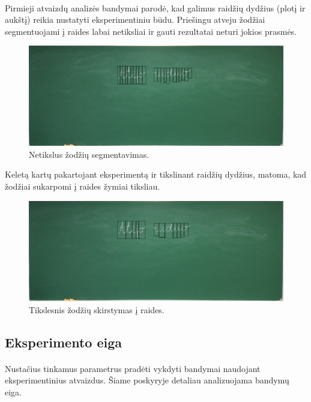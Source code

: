 \documentclass[a4paper,12pt]{article}
\begin{document}
\paragraph{} Pirmieji atvaizdų analizės bandymai parodė, kad galimus raidžių dydžius (plotį ir aukštį) reikia nustatyti eksperimentiniu būdu. Priešingu atveju žodžiai segmentuojami į raides labai netiksliai ir gauti rezultatai neturi jokios prasmės.
		\begin{figure}[H]
			\centering
			\includegraphics[scale=0.2]{images/wrongsegmentation}
			\caption{Netikslus žodžių segmentavimas.}   %
			\label{img:wrongsegmentation}
		\end{figure}

Keletą kartų pakartojant eksperimentą ir tikslinant raidžių dydžius, matoma, kad žodžiai sukarpomi į raides žymiai tiksliau.
	\begin{figure}[H]
		\centering
		\includegraphics[scale=0.2]{images/rightsegmentation}
		\caption{Tikslesnis žodžių skirstymas į raides.}   %
		\label{img:rightsegmentation}
	\end{figure}
	
\subsection{Eksperimento eiga}
\paragraph{} Nustačius tinkamus parametrus pradėti vykdyti bandymai naudojant eksperimentinius atvaizdus. Šiame poskyryje detaliau analizuojama bandymų eiga.
\end{document}
